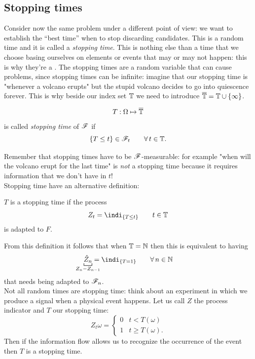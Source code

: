 \documentclass{report}
\begin{document}
\subsection{Stopping times}
Consider now the same problem under a different point of view: we want to establish the ``best time'' when to stop discarding candidates. This is a random time and it is called a \emph{stopping time}. This is nothing else than a time that we choose basing ourselves on elements or events that may or may not happen: this is why they're a \rv. The stopping times are a random variable that can cause problems, since stopping times can be infinite: imagine that our stopping time is "whenever a volcano erupts" but the stupid volcano decides to go into quiescence forever. This is why beside our index set $\mathbb{T}$ we need to introduce $\overline{\mathbb{T}}=\mathbb{T}\cup\{\infty\}$.
\begin{definition}
	\[T:\Omega\mapsto\overline{\mathbb{T}}
	\]
	is called \emph{stopping time} of $\mathscr{F}$ if
	\[\{T\leq t\}\in\mathscr{F}_t\qquad\forall\, t\in\mathbb{T}.\]
\end{definition}
Remember that stopping times have to be $\mathscr{F}$-measurable: for example "when will the volcano erupt for the last time" is \textit{not} a stopping time because it requires information that we don't have in $t$! \\
Stopping time have an alternative definition:
\begin{definition}
	$T$ is a stopping time if the process
	\[Z_t=\indi_{\{T\leq t\}}\qquad t\in\T\]
	is adapted to $F$.
\end{definition}
From this definition it follows that when $\mathbb{T}=\mathbb{N}$ then this is equivalent to having
\[\underbracket[0.6pt]{\hat{Z}_{n}}_{\mathclap{Z_n-Z_{n-1}}}=\indi_{\{T=1\}}\qquad\every n\in\N\]
that needs being adapted to $\mathscr{F}_n$.\\
Not all random times are stopping time: think about an experiment in which we produce a signal when a physical event happens. Let us call $Z$ the process indicator and $T$ our stopping time:
\[Z_t{\omega}=\begin{cases}
	0&t<T(\omega)\\
	1&t\geq T(\omega).
\end{cases}\]
Then if the information flow allows us to recognize the occurrence of the event then $T$ is a stopping time.
\end{document}
